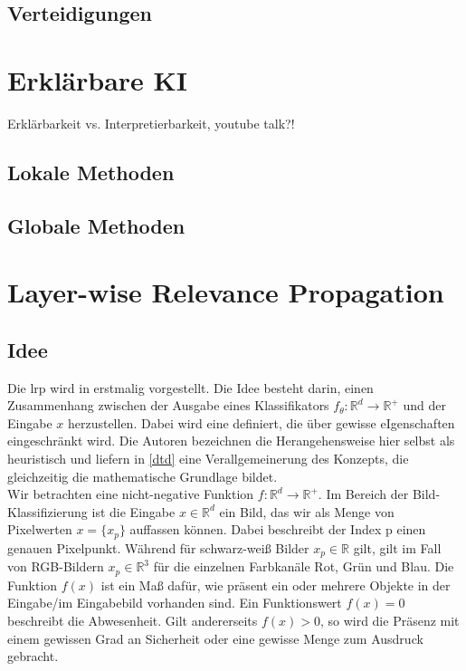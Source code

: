 \documentclass[twoside, 12pt,a4paper]{article}
\numberwithin{equation}{section}
\begin{document}
	\subsection{Verteidigungen}
	\section{Erklärbare KI} \label{chapter_xai}
	
	Erklärbarkeit vs. Interpretierbarkeit, youtube talk?!
	
	\subsection{Lokale Methoden}
	
	\subsection{Globale Methoden}
	
	\section{Layer-wise Relevance Propagation} \label{chapter_lrp}
	\subsection{Idee}
	
	Die \gls{lrp} wird in \cite{LRP_first_paper} erstmalig vorgestellt. Die Idee besteht darin, einen Zusammenhang zwischen der Ausgabe eines Klassifikators $f_{\theta}: \mathbb{R}^d\to \mathbb{R^{+}}$ und der Eingabe $x$ herzustellen. Dabei wird eine definiert, die über gewisse eIgenschaften eingeschränkt wird. Die Autoren bezeichnen die Herangehensweise hier selbst als heuristisch und liefern in \ref{dtd} eine Verallgemeinerung des Konzepts, die gleichzeitig die mathematische Grundlage bildet.\\
	
	Wir betrachten eine nicht-negative Funktion $f: \mathbb{R}^d \to \mathbb{R}^{+}$. Im Bereich der Bild-Klassifizierung ist die Eingabe $x \in \mathbb{R}^d$ ein Bild, das wir als Menge von Pixelwerten $x=\lbrace x_p \rbrace$ auffassen können. Dabei beschreibt der Index p einen genauen Pixelpunkt. Während für schwarz-weiß Bilder $x_p \in \mathbb{R}$ gilt, gilt im Fall von RGB-Bildern $x_p \in \mathbb{R}^3$ für die einzelnen Farbkanäle Rot, Grün und Blau. Die Funktion $f(x)$ ist ein Maß dafür, wie präsent ein oder mehrere Objekte in der Eingabe/im Eingabebild vorhanden sind. Ein Funktionswert $f(x)=0$ beschreibt die Abwesenheit. Gilt andererseits $f(x) >0$, so wird die Präsenz mit einem gewissen Grad an Sicherheit oder eine gewisse Menge zum Ausdruck gebracht.\\
	
\end{document}
